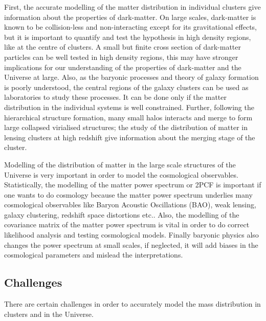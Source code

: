 \documentclass[
  11pt,
  twoside,
  openright,
  titlepage,
  headings=optiontoheadandtoc
]{scrbook}
\begin{document}
First, the accurate modelling of the matter distribution in individual clusters
give information about the properties of dark-matter. On large scales, dark-matter
is known to be collision-less and non-interacting except for its gravitational effects,
but it is important to quantify and test the hypothesis in high density regions, like
at the centre of clusters. A small but finite cross section of dark-matter particles
can be well tested in high density regions, this may have stronger implications for our 
understanding of the properties of dark-matter and the Universe at large.  
Also, as the baryonic processes and theory of galaxy
formation is poorly understood, the central regions of the galaxy clusters can be 
used as laboratories to study these processes. It can be done only if the matter 
distribution in the individual systems is well constrained. 
Further, following the hierarchical structure formation, many small halos interacts and
merge to form large collapsed virialised structures; the study of the distribution of 
matter in lensing clusters at high redshift give information about the merging
stage of the cluster. 

Modelling of the distribution of matter in the large scale structures of the  
Universe is very important
in order to model the cosmological observables. Statistically, the modelling of the
matter power spectrum or 2PCF is important if one wants to do cosmology because 
the matter power spectrum underlies many
cosmological observables like Baryon Acoustic Oscillations (BAO), 
weak lensing, galaxy clustering, redshift
space distortions etc.. Also, the modelling of the 
covariance matrix of the matter power spectrum is vital in order to do correct
likelihood analysis and testing cosmological models. Finally baryonic physics 
also changes the power spectrum at small scales, if neglected, it will add biases
in the cosmological parameters and mislead the interpretations. 

\subsection{Challenges}

There are certain challenges in order to accurately model the mass distribution
in clusters and in the Universe. 
\end{document}
